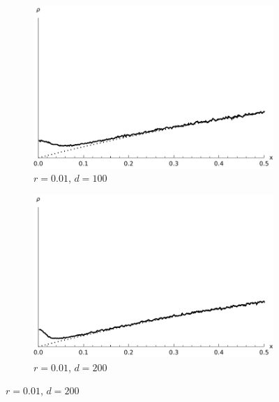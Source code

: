 \documentclass[a4paper,12pt,reqno,superscriptaddress,nofootinbib]{article}
\theoremstyle{plain}
\theoremstyle{definition}
\theoremstyle{remark}
\newcommand{\0}{^{(0)}}
\newcommand{\1}{^{(1)}}
\newcommand{\2}{^{(2)}}
\begin{document}
\begin{figure}
	\begin{subfigure}{0.48\textwidth}
		\includegraphics[width=\textwidth]{spd_r001_d100.pdf}
		\caption{$r=0.01$, $d=100$}
	\end{subfigure}\hfill
	\begin{subfigure}{0.48\textwidth}
		\includegraphics[width=\textwidth]{spd_r001_d200.pdf}
		\caption{$r=0.01$, $d=200$}
	\end{subfigure}
	

\end{figure}
\end{document}
